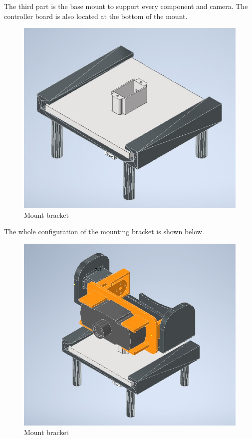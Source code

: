\documentclass[12pt, titlepage]{article}
\begin{document}
The third part is the base mount to support every component and camera. The controller board is also located at the bottom of the mount.
\begin{figure}[H]
\centering
\includegraphics[width=\textwidth]{mount_base.jpg}
\caption{Mount bracket}
\end{figure}

The whole configuration of the mounting bracket is shown below.

\begin{figure}[H]
\centering
\includegraphics[width=\textwidth]{smartvault.jpg}
\caption{Mount bracket}
\end{figure}
\end{document}
